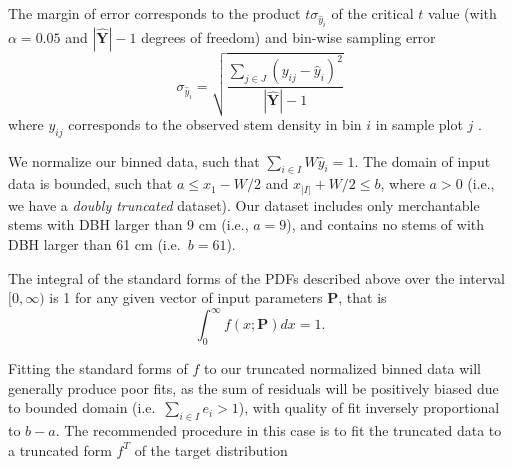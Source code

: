 \documentclass{article}
\begin{document}
  The margin of error corresponds to the product $t\sigma_{\hat{y}_i}$ of the critical $t$ value (with $\alpha=0.05$ and $|\bm{\hat{Y}}|  - 1$ degrees of freedom) and bin-wise sampling error
  \begin{equation}
    \sigma_{\hat{y}_i}  = \sqrt{\frac{\sum_{j \in J} \left(y_{ij} - \hat{y}_i\right)^2}{|\bm{\hat{Y}}| - 1}}
  \end{equation}
  where $y_{ij}$ corresponds to the observed stem density in bin $i$ in sample plot $j$ \citep{schreuder2004statistical}.

  We normalize our binned data, such that $\sum_{i \in I} W\hat{y}_i = 1$.
  The domain of input data is bounded, such that $a \leq x_1 - W/2$ and $x_{|I|} + W/2 \leq b$, where $a > 0$ (i.e., we have a \emph{doubly truncated} dataset).
  Our dataset includes only merchantable stems with DBH larger than 9 cm (i.e., $a=9$), and contains no stems of with DBH larger than 61 cm (i.e.~$b = 61$).
  
The integral of the standard forms of the PDFs described above over the interval $[0, \infty)$ is 1 for any given vector of input parameters $\bm{P}$, that is
\begin{equation}
\int_0^\infty f(x; \bm{P}) dx =  1.
\end{equation}

Fitting the standard forms of $f$ to our truncated normalized binned data will generally produce poor fits, as the sum of residuals will be positively biased due to bounded domain (i.e.~$\sum_{i \in I} e_i>1$), with quality of fit inversely proportional to $b - a$.
The recommended procedure in this case is to fit the truncated data to a truncated form $f^T$ of the target distribution
\end{document}
